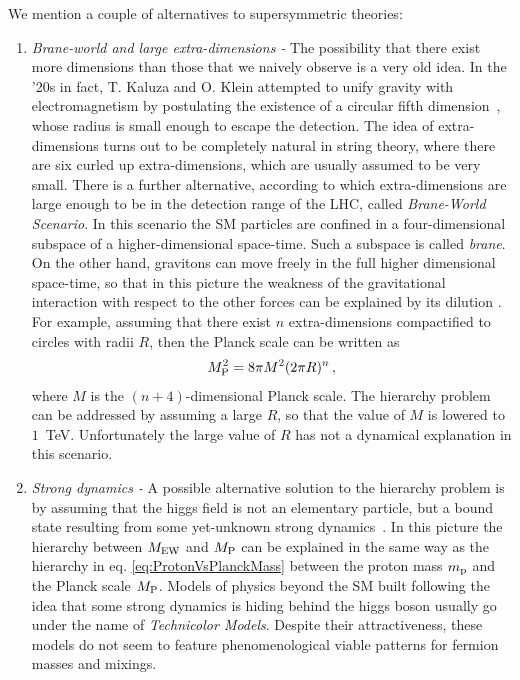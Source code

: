 \documentclass[12pt,a4paper]{book}
\newcommand{\ben}{\begin{enumerate}}
\newcommand{\een}{\end{enumerate}}
\begin{document}
We mention a couple of alternatives to supersymmetric theories:
\ben
\item \textit{Brane-world and large extra-dimensions - } The possibility that there exist more dimensions than those that we naively observe is a very old idea. In the '20s in fact, T. Kaluza and O. Klein attempted to unify gravity with electromagnetism by postulating the existence of a circular fifth dimension~\cite{Kaluza:1921tu, Klein:1926tv}, whose radius is small enough to escape the detection. The idea of extra-dimensions turns out to be completely natural in string theory, where there are six curled up extra-dimensions, which are usually assumed to be very small. There is a further alternative, according to which extra-dimensions are large enough to be in the detection range of the LHC, called \textit{Brane-World Scenario}. In this scenario the SM particles are confined in a four-dimensional subspace of a higher-dimensional space-time. Such a subspace is called \textit{brane}. On the other hand, gravitons can move freely in the full higher dimensional space-time, so that in this picture the weakness of the gravitational interaction with respect to the other forces can be explained by its dilution \cite{Witten:1996mz}. For example, assuming that there exist $n$ extra-dimensions compactified to circles with radii $R$, then the Planck scale can be written as
\begin{align}
\label{eq:PlanckScaleBraneWorld}
M_{\rm P}^2 = 8 \pi M^2 (2 \pi R)^n\,,
\end{align}
where $M$ is the $(n+4)$-dimensional Planck scale. The hierarchy problem can be addressed by assuming a large $R$, so that the value of $M$ is lowered to $1 \,$ TeV. Unfortunately the large value of $R$ has not a dynamical explanation in this scenario.


\item \textit{Strong dynamics - } A possible alternative solution to the hierarchy problem is by assuming that the higgs field is not an elementary particle, but a bound state resulting from some yet-unknown strong dynamics~\cite{Dimopoulos:1979qi}. In this picture the hierarchy between $M_{\rm EW}$ and $M_{\rm P}$ can be explained in the same way as the hierarchy in eq. \eqref{eq:ProtonVsPlanckMass} between the proton mass $m_{\rm p}$ and the Planck scale $M_{\rm P}$. Models of physics beyond the SM built following the idea that some strong dynamics is hiding behind the higgs boson usually go under the name of \textit{Technicolor Models}. Despite their attractiveness, these models do not seem to feature phenomenological viable patterns for fermion masses and mixings.
\een
\end{document}

